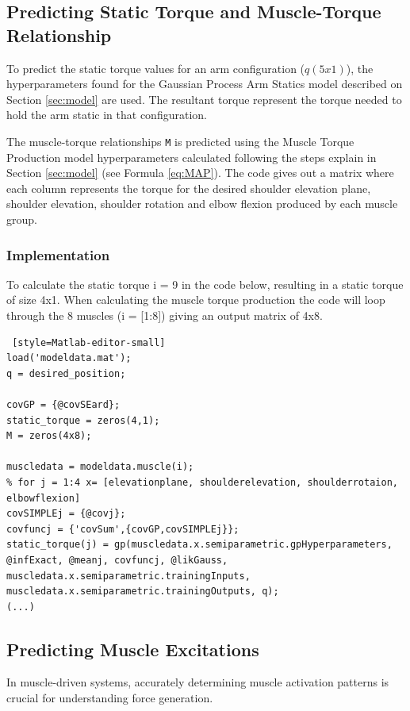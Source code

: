 \subsection{Predicting Static Torque and Muscle-Torque Relationship}

To predict the static torque values for an arm configuration ($q (5x1)$), the hyperparameters found for the Gaussian Process Arm Statics model described on Section \ref{sec:model} are used. The resultant torque represent the torque needed to hold the arm static in that configuration.

The muscle-torque relationships \texttt{M} is predicted using the Muscle Torque Production model hyperparameters calculated following the steps explain in Section \ref{sec:model} (see Formula \ref{eq:MAP}). The code gives out a matrix where each column represents the torque for the desired shoulder elevation plane, shoulder elevation, shoulder rotation and elbow flexion produced by each muscle group.

\subsubsection{Implementation}
To calculate the static torque i = 9 in the code below, resulting in a static torque of size 4x1.  When calculating the muscle torque production the code will loop through the 8 muscles (i = [1:8]) giving an output matrix of 4x8.
\newpage
\begin{lstlisting} [style=Matlab-editor-small]
load('modeldata.mat');
q = desired_position;

covGP = {@covSEard};
static_torque = zeros(4,1);
M = zeros(4x8);

muscledata = modeldata.muscle(i);
% for j = 1:4 x= [elevationplane, shoulderelevation, shoulderrotaion, elbowflexion]
covSIMPLEj = {@covj};
covfuncj = {'covSum',{covGP,covSIMPLEj}};
static_torque(j) = gp(muscledata.x.semiparametric.gpHyperparameters, @infExact, @meanj, covfuncj, @likGauss, muscledata.x.semiparametric.trainingInputs, muscledata.x.semiparametric.trainingOutputs, q);
(...)
\end{lstlisting}


\subsection{Predicting Muscle Excitations}\label{computemuscleexcitation}

In muscle-driven systems, accurately determining muscle activation patterns is crucial for understanding force generation. 

